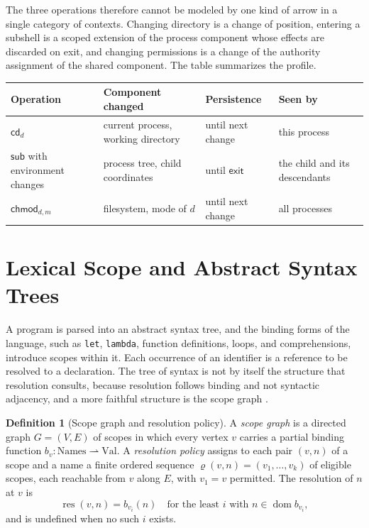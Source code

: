 \documentclass[11pt]{article}
\theoremstyle{definition}
\newtheorem{definition}[theorem]{Definition}
\theoremstyle{remark}
\newcommand{\res}{\operatorname{res}}
\newcommand{\dom}{\operatorname{dom}}
\newcommand{\pfn}{\rightharpoonup}
\begin{document}
The three operations therefore cannot be modeled by one kind of arrow in a single category of contexts. Changing directory is a change of position, entering a subshell is a scoped extension of the process component whose effects are discarded on exit, and changing permissions is a change of the authority assignment of the shared component. The table summarizes the profile.

\begin{center}
\begin{tabular}{p{}p{}p{}p{}}
\toprule
Operation & Component changed & Persistence & Seen by\\
\midrule
$\mathsf{cd}_d$ & current process, working directory & until next change & this process\\
$\mathsf{sub}$ with environment changes & process tree, child coordinates & until $\mathsf{exit}$ & the child and its descendants\\
$\mathsf{chmod}_{d,m}$ & filesystem, mode of $d$ & until next change & all processes\\
\bottomrule
\end{tabular}
\end{center}

\section{Lexical Scope and Abstract Syntax Trees}

A program is parsed into an abstract syntax tree, and the binding forms of the language, such as \texttt{let}, \texttt{lambda}, function definitions, loops, and comprehensions, introduce scopes within it. Each occurrence of an identifier is a reference to be resolved to a declaration. The tree of syntax is not by itself the structure that resolution consults, because resolution follows binding and not syntactic adjacency, and a more faithful structure is the scope graph \cite{scopegraphs}.

\begin{definition}[Scope graph and resolution policy]\label{def:scopegraph}
A \emph{scope graph} is a directed graph $G=(V,E)$ of scopes in which every vertex $v$ carries a partial binding function $b_v:\mathrm{Names}\pfn\mathrm{Val}$. A \emph{resolution policy} assigns to each pair $(v,n)$ of a scope and a name a finite ordered sequence $\varrho(v,n)=(v_1,\dots,v_k)$ of eligible scopes, each reachable from $v$ along $E$, with $v_1=v$ permitted. The resolution of $n$ at $v$ is
\[
\res(v,n)=b_{v_i}(n)\quad\text{for the least }i\text{ with }n\in\dom b_{v_i},
\]
and is undefined when no such $i$ exists.
\end{definition}
\end{document}
